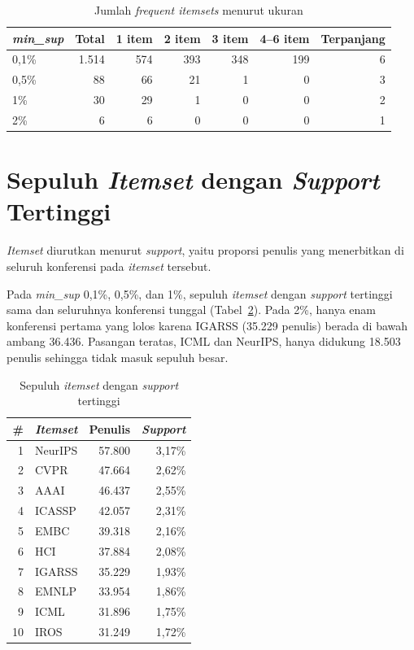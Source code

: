 \begin{table}[!htb]
\caption{Jumlah \textit{frequent itemsets} menurut ukuran}
\label{tab:t4-ukuran}
\small
\begin{tabular*}{\textwidth}{@{\extracolsep{\fill}}@{}lrrrrrr@{}}
\toprule
\textbf{\textit{min\_sup}} & \textbf{Total} & \textbf{1 item} & \textbf{2 item} & \textbf{3 item} & \textbf{4--6 item} & \textbf{Terpanjang} \\
\midrule
0,1\% & 1.514 & 574 & 393 & 348 & 199 & 6 \\
0,5\% & 88 & 66 & 21 & 1 & 0 & 3 \\
1\% & 30 & 29 & 1 & 0 & 0 & 2 \\
2\% & 6 & 6 & 0 & 0 & 0 & 1 \\
\bottomrule
\end{tabular*}
\end{table}

\section{Sepuluh \textit{Itemset} dengan \textit{Support} Tertinggi}
\label{sec:hasil-t4-top10}
\textit{Itemset} diurutkan menurut \textit{support}, yaitu proporsi penulis yang menerbitkan di seluruh konferensi pada \textit{itemset} tersebut.

Pada \textit{min\_sup} 0,1\%, 0,5\%, dan 1\%, sepuluh \textit{itemset} dengan \textit{support} tertinggi sama dan seluruhnya konferensi tunggal (Tabel~\ref{tab:t4-top10}). Pada 2\%, hanya enam konferensi pertama yang lolos karena IGARSS (35.229 penulis) berada di bawah ambang 36.436. Pasangan teratas, ICML dan NeurIPS, hanya didukung 18.503 penulis sehingga tidak masuk sepuluh besar.

\begin{table}[!htb]
\caption{Sepuluh \textit{itemset} dengan \textit{support} tertinggi}
\label{tab:t4-top10}
\small
\begin{tabular*}{\textwidth}{@{\extracolsep{\fill}}@{}rlrr@{}}
\toprule
\textbf{\#} & \textbf{\textit{Itemset}} & \textbf{Penulis} & \textbf{\textit{Support}} \\
\midrule
1 & NeurIPS & 57.800 & 3,17\% \\
2 & CVPR & 47.664 & 2,62\% \\
3 & AAAI & 46.437 & 2,55\% \\
4 & ICASSP & 42.057 & 2,31\% \\
5 & EMBC & 39.318 & 2,16\% \\
6 & HCI & 37.884 & 2,08\% \\
7 & IGARSS & 35.229 & 1,93\% \\
8 & EMNLP & 33.954 & 1,86\% \\
9 & ICML & 31.896 & 1,75\% \\
10 & IROS & 31.249 & 1,72\% \\
\bottomrule
\end{tabular*}
\end{table}

